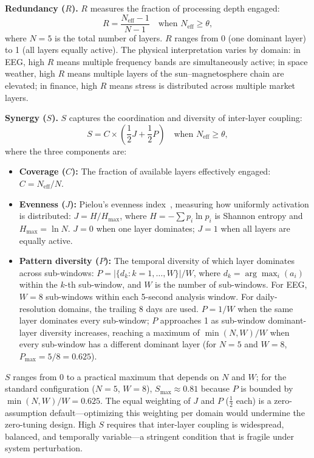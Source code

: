 \documentclass[12pt,a4paper]{article}
\begin{document}
\textbf{Redundancy ($R$).} $R$ measures the fraction of processing depth engaged:
\begin{equation}
R = \frac{N_{\text{eff}} - 1}{N - 1} \quad \text{when } N_{\text{eff}} \geq \theta,
\end{equation}
where $N = 5$ is the total number of layers. $R$ ranges from 0 (one dominant layer) to 1 (all layers equally active). The physical interpretation varies by domain: in EEG, high $R$ means multiple frequency bands are simultaneously active; in space weather, high $R$ means multiple layers of the sun--magnetosphere chain are elevated; in finance, high $R$ means stress is distributed across multiple market layers.

\textbf{Synergy ($S$).} $S$ captures the coordination and diversity of inter-layer coupling:
\begin{equation}
S = C \times \left(\frac{1}{2} J + \frac{1}{2} P\right) \quad \text{when } N_{\text{eff}} \geq \theta,
\end{equation}
where the three components are:

\begin{itemize}
\item \textbf{Coverage ($C$):} The fraction of available layers effectively engaged: $C = N_{\text{eff}} / N$.

\item \textbf{Evenness ($J$):} Pielou's evenness index~\cite{pielou1966}, measuring how uniformly activation is distributed: $J = H / H_{\max}$, where $H = -\sum p_i \ln p_i$ is Shannon entropy and $H_{\max} = \ln N$. $J = 0$ when one layer dominates; $J = 1$ when all layers are equally active.

\item \textbf{Pattern diversity ($P$):} The temporal diversity of which layer dominates across sub-windows: $P = |\{d_k : k = 1, \ldots, W\}| / W$, where $d_k = \arg\max_i(a_i)$ within the $k$-th sub-window, and $W$ is the number of sub-windows. For EEG, $W = 8$ sub-windows within each 5-second analysis window. For daily-resolution domains, the trailing 8 days are used. $P = 1/W$ when the same layer dominates every sub-window; $P$ approaches 1 as sub-window dominant-layer diversity increases, reaching a maximum of $\min(N, W)/W$ when every sub-window has a different dominant layer (for $N = 5$ and $W = 8$, $P_{\max} = 5/8 = 0.625$).
\end{itemize}

$S$ ranges from 0 to a practical maximum that depends on $N$ and $W$; for the standard configuration ($N = 5$, $W = 8$), $S_{\max} \approx 0.81$ because $P$ is bounded by $\min(N, W)/W = 0.625$. The equal weighting of $J$ and $P$ ($\frac{1}{2}$ each) is a zero-assumption default---optimizing this weighting per domain would undermine the zero-tuning design. High $S$ requires that inter-layer coupling is widespread, balanced, and temporally variable---a stringent condition that is fragile under system perturbation.
\end{document}
